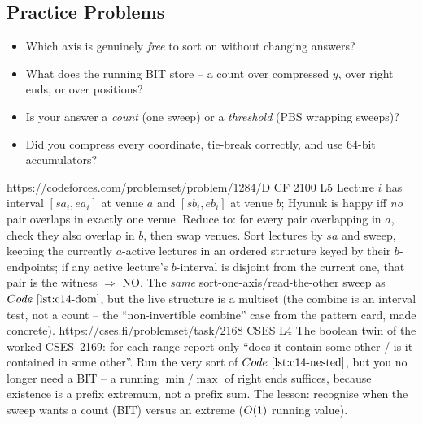 \subsection{Practice Problems}

\begin{stuckbox}
\begin{itemize}[nosep,leftmargin=1.4em]
  \item Which axis is genuinely \emph{free} to sort on without changing answers?
  \item What does the running BIT store -- a count over compressed \(y\), over
        right ends, or over positions?
  \item Is your answer a \emph{count} (one sweep) or a \emph{threshold} (PBS
        wrapping sweeps)?
  \item Did you compress every coordinate, tie-break correctly, and use 64-bit
        accumulators?
\end{itemize}
\end{stuckbox}

\begin{practiceset}
    {https://codeforces.com/problemset/problem/1284/D}
    {CF 2100 L5}
    {Lecture \(i\) has interval \([sa_i,ea_i]\) at venue \(a\) and \([sb_i,eb_i]\)
     at venue \(b\); Hyunuk is happy iff \emph{no} pair overlaps in exactly one
     venue.  Reduce to: for every pair overlapping in \(a\), check they also
     overlap in \(b\), then swap venues.  Sort lectures by \(sa\) and sweep,
     keeping the currently \(a\)-active lectures in an ordered structure keyed
     by their \(b\)-endpoints; if any active lecture's \(b\)-interval is
     disjoint from the current one, that pair is the witness \(\Rightarrow\) NO.
     The \emph{same} sort-one-axis/read-the-other sweep as \(\coderef{c14-dom}\),
     but the live structure is a multiset (the combine is an interval test, not
     a count -- the ``non-invertible combine'' case from the pattern card, made
     concrete).}
    {https://cses.fi/problemset/task/2168}
    {CSES L4}
    {The boolean twin of the worked CSES~2169: for each range report only
     ``does it contain some other / is it contained in some other''.  Run the
     very sort of \(\coderef{c14-nested}\), but you no longer need a BIT -- a
     running \(\min/\max\) of right ends suffices, because existence is a
     prefix extremum, not a prefix sum.  The lesson: recognise when the sweep
     wants a count (BIT) versus an extreme (\(O(1)\) running value).}
\end{practiceset}

